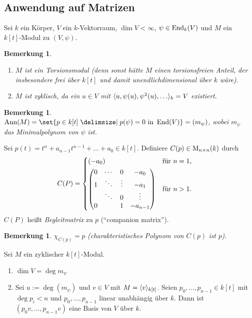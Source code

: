 \documentclass[12pt,a4paper]{scrartcl}
\theoremstyle{cplain}
\theoremstyle{cdef}
\newtheorem{beme}[thmcounter]{Bemerkung}
\begin{document}
\subsection{Anwendung auf Matrizen}
Sei $k$ ein Körper, $V$ ein $k$-Vektorraum, $\dim V<\infty$, $\psi\in \operatorname{End}_k(V)$ und $M$ ein $k[t]$-Modul zu $(V,\psi)$.
\begin{beme} \label{bem:4.18}
	\leavevmode
	\begin{enumerate}
		\item $M$ ist ein Torsionsmodul (denn sonst hätte $M$ einen torsionsfreien Anteil, der insbesondere frei über $k[t]$ und damit unendlichdimensional über $k$ wäre).
		\item $M$ ist zyklisch, da ein $u\in V$ mit $\<u, \psi(u), \psi^2(u),\dots\>_k = V$ existiert.
	\end{enumerate}
\end{beme}
\begin{beme}
	$\Ann(M) = \set{p\in k[t] \given p(\psi) = 0 \text{ in } \End(V)} = (m_{\psi})$, wobei $m_{\psi}$ das Minimalpolynom von $\psi$ ist.
\end{beme}
\begin{defi}
	Sei $p(t) = t^n+a_{n-1}t^{n-1}+\dots + a_0\in k[t]$. Definiere $C(p) \in \operatorname{M}_{n\times n}(k)$ durch \[
		C(P) = \begin{cases*}
			(-a_0) & für $n = 1$, \\
			\begin{pmatrix}
				0 & \cdots & 0 & -a_0 \\ 
				1 & \ddots & \vdots & -a_1 \\ 
				& \ddots & 0 & \vdots \\ 
				0 &  & 1 & -a_{n-1}
			\end{pmatrix} & für $n > 1$.
		\end{cases*}
	\]
	$C(P)$ heißt \emph{Begleitmatrix} zu $p$ (\enquote{companion matrix}).
\end{defi}
\begin{beme}
	$\chi_{C(p)} = p$ (charakteristisches Polynom von $C(p)$ ist $p$).
\end{beme}
\begin{lem} \label{lem:4.22}
	Sei $M$ ein zyklischer $k[t]$-Modul.
	\begin{enumerate}
		\item $\dim V = \deg m_{\psi}$ \label{lem:4.22:i}
		\item Sei $u := \deg(m_{\psi})$ und $v\in V$ mit $M = \langle v\rangle_{k[t]}$. Seien $p_0,\dots, p_{n-1}\in k[t]$ mit $\deg p_i<n$ und $p_0,\dots, p_{n-1}$ linear unabhängig über $k$. Dann ist $(p_0v, \dots, p_{n-1}v)$ eine Basis von $V$ über $k$. \label{lem:4.22:ii}
	\end{enumerate}
\end{lem}
\end{document}
